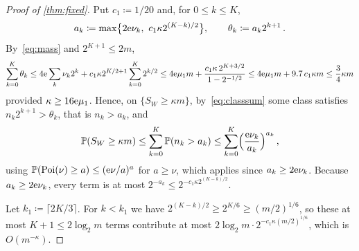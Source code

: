 \documentclass[11pt,letterpaper]{article}
\begin{document}
\begin{proof}[Proof of \cref{thm:fixed}]
Put $c_1\coloneqq1/20$ and, for $0\le k\le K$,
\begin{equation}
\label{eq:thresholds}
  a_k\coloneqq\max\bigl\{2\e\nu_k,\ c_1\kappa2^{(K-k)/2}\bigr\},\qquad\theta_k\coloneqq a_k2^{k+1}\,.
\end{equation}
By~\eqref{eq:mass} and $2^{K+1}\le2m$,
\begin{equation*}
  \sum_{k=0}^K\theta_k\le4\mathrm{e}\sum_k\nu_k2^k+c_1\kappa2^{K/2+1}\sum_{k=0}^K2^{k/2}
  \le4\mathrm{e}\mu_1m+\frac{c_1\kappa\,2^{K+3/2}}{1-2^{-1/2}}\le4\mathrm{e}\mu_1m+9.7\,c_1\kappa m\le\frac34\kappa m
\end{equation*}
provided $\kappa\ge16\mathrm{e}\mu_1$. Hence, on $\{S_W\ge\kappa m\}$, by~\eqref{eq:classsum} some class satisfies $n_k2^{k+1}>\theta_k$, that is $n_k>a_k$, and
\begin{equation}
\label{eq:union}
  \mathbb P(S_W\ge\kappa m)\le\sum_{k=0}^K\mathbb P(n_k>a_k)\le\sum_{k=0}^K\Bigl(\frac{\mathrm{e}\nu_k}{a_k}\Bigr)^{a_k}\,,
\end{equation}
using $\mathbb P(\mathrm{Poi}(\nu)\ge a)\le(\mathrm{e}\nu/a)^a$ for $a\ge\nu$, which applies since $a_k\ge2\mathrm{e}\nu_k$. Because $a_k\ge2\mathrm{e}\nu_k$, every term is at most $2^{-a_k}\le2^{-c_1\kappa2^{(K-k)/2}}$.

Let $k_1\coloneqq\lceil2K/3\rceil$. For $k<k_1$ we have $2^{(K-k)/2}\ge2^{K/6}\ge(m/2)^{1/6}$, so these at most $K+1\le2\log_2m$ terms contribute at most $2\log_2m\cdot2^{-c_1\kappa(m/2)^{1/6}}$, which is $O(m^{-\kappa})$.


\end{proof}
\end{document}
